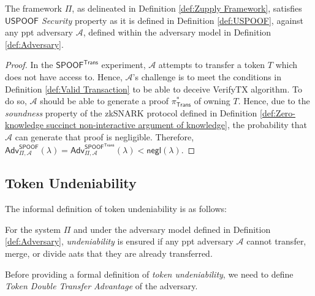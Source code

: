 \begin{theorem}

The framework $\Pi$, as delineated in Definition \ref{def:Zupply Framework}, satisfies \textit{$\mathsf{USPOOF}$ Security} property as it is defined in Definition \ref{def:USPOOF}, against any \gls{ppt} adversary $\mathcal{A}$, defined within the adversary model in Definition \ref{def:Adversary}.

\end{theorem}

\begin{proof}
    In the $\mathsf{SPOOF}^\mathsf{Trans}$ experiment, $\mathcal{A}$ attempts to transfer a token $T$ which does not have access to. Hence, $\mathcal{A}$'s challenge is to meet the conditions in Definition \ref{def:Valid Transaction} to be able to deceive \textsf{VerifyTX} algorithm. To do so, $\mathcal{A}$ should be able to generate a proof $\pi^\ast_\mathsf{Trans}$ of owning $T$. Hence, due to the \textit{soundness} property of the zkSNARK protocol defined in Definition \ref{def:Zero-knowledge succinct non-interactive argument of knowledge}, the probability that $\mathcal{A}$ can generate that proof is negligible. Therefore, $\mathsf{Adv}^{\mathsf{SPOOF}}_{\Pi, \mathcal{A}}(\lambda) = \mathsf{Adv}^{\mathsf{SPOOF}^\mathsf{Trans}}_{\Pi, \mathcal{A}}(\lambda) < \mathsf{negl}(\lambda)$.   
\end{proof}


\subsection{Token Undeniability}

The informal definition of token undeniability is as follows:

\begin{definition}
    For the system  \( \Pi \) and under the adversary model defined in Definition \ref{def:Adversary}, \textit{undeniability} is ensured if any \gls{ppt} adversary $\mathcal{A}$ cannot transfer, merge, or divide \gls{aat}s that they are already transferred.
\end{definition}

Before providing a formal definition of \textit{token undeniability}, we need to define \textit{Token Double Transfer Advantage} of the adversary.


